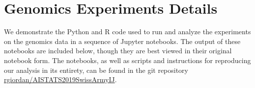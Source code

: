 \documentclass{article}
\begin{document}



\newpage
\onecolumn
\appendix



\section{Genomics Experiments Details}\label{sec:appendix_genomics}

We demonstrate the Python and R code used to run and analyze the experiments on
the genomics data in a sequence of Jupyter notebooks. The output of these
notebooks are included below, though they are best viewed in their original
notebook form. The notebooks, as well as scripts and instructions for
reproducing our analysis in its entirety, can be found in the git repository
\href{https://github.com/rgiordan/AISTATS2019SwissArmyIJ}{rgiordan/AISTATS2019SwissArmyIJ}.





\end{document}
